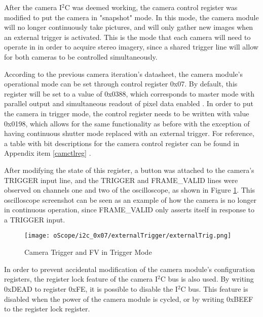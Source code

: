 \par
After the camera I$^2$C was deemed working, the camera control register was modified to put the camera in "snapshot" mode. In this mode, the camera module will no longer continuously take pictures, and will only gather new images when an external trigger is activated. This is the mode that each camera will need to operate in in order to acquire stereo imagery, since a shared trigger line will allow for both cameras to be controlled simultaneously.
\par
According to the previous camera iteration's datasheet, the camera module's operational mode can be set through control register 0x07. By default, this register will be set to a value of 0x0388, which corresponds to master mode with parallel output and simultaneous readout of pixel data enabled \cite{mt9v032}. In order to put the camera in trigger mode, the control register needs to be written with value 0x0198, which allows for the same functionality as before with the exception of having continuous shutter mode replaced with an external trigger. For reference, a table with bit descriptions for the camera control register can be found in Appendix item \ref{camctlreg} \cite{mt9v032}.
\par
After modifying the state of this register, a button was attached to the camera's TRIGGER input line, and the TRIGGER and FRAME\_VALID lines were observed on channels one and two of the oscilloscope, as shown in Figure \ref{camInTrigMode}. This oscilloscope screenshot can be seen as an example of how the camera is no longer in continuous operation, since FRAME\_VALID only asserts itself in response to a TRIGGER input. 
\begin{figure}[H]
	\centerline{\texttt{[image: oScope/i2c\_0x07/externalTrigger/externalTrig.png]}}
	\caption{Camera Trigger and FV in Trigger Mode}
	\label{camInTrigMode}
\end{figure}
\par
In order to prevent accidental modification of the camera module's configuration registers, the register lock feature of the camera I$^2$C bus is also used. By writing 0xDEAD to register 0xFE, it is possible to disable the I$^2$C bus. This feature is disabled when the power of the camera module is cycled, or by writing 0xBEEF to the register lock register.
